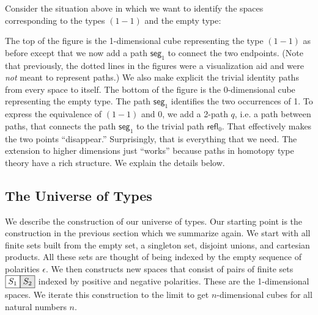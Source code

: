 \documentclass[authoryear,preprint]{sigplanconf}
\newcommand{\refl}[1]{\textsf{refl}_{#1}}
\newcommand{\seg}[1]{\textsf{seg}_{#1}}
\newcommand{\mm}{\texttt{-}}
\newcommand{\pp}{\texttt{+}}
\newcommand{\nodet}[2]{\fcolorbox{black}{white}{$#1$}\fcolorbox{black}{gray!20}{$#2$}}
\begin{document}
Consider the situation above in which we want to identify the spaces
corresponding to the types $(1-1)$ and the empty type:
\begin{center}
\end{center}
The top of the figure is the 1-dimensional cube representing the type $(1-1)$
as before except that we now add a path $\seg{1}$ to connect the two
endpoints. (Note that previously, the dotted lines in the figures were a
visualization aid and were \emph{not} meant to represent paths.) We also make
explicit the trivial identity paths from every space to itself.  The bottom
of the figure is the 0-dimensional cube representing the empty type. The path
$\seg{1}$ identifies the two occurrences of 1. To express the equivalence of
$(1-1)$ and 0, we add a 2-path $q$, i.e. a path between paths, that connects
the path $\seg{1}$ to the trivial path $\refl{0}$. That effectively makes the
two points ``disappear.''  Surprisingly, that is everything that we need. The
extension to higher dimensions just ``works'' because paths in homotopy type
theory have a rich structure. We explain the details below.

\subsection{The Universe of Types}

We describe the construction of our universe of types. Our starting point is
the construction in the previous section which we summarize again. We start
with all finite sets built from the empty set, a singleton set, disjoint
unions, and cartesian products. All these sets are thought of being indexed
by the empty sequence of polarities $\epsilon$. We then constructs new spaces
that consist of pairs of finite sets $\nodet{S_1}{S_2}$ indexed by positive
and negative polarities. These are the 1-dimensional spaces. We iterate this
construction to the limit to get $n$-dimensional cubes for all natural
numbers $n$.
\end{document}
